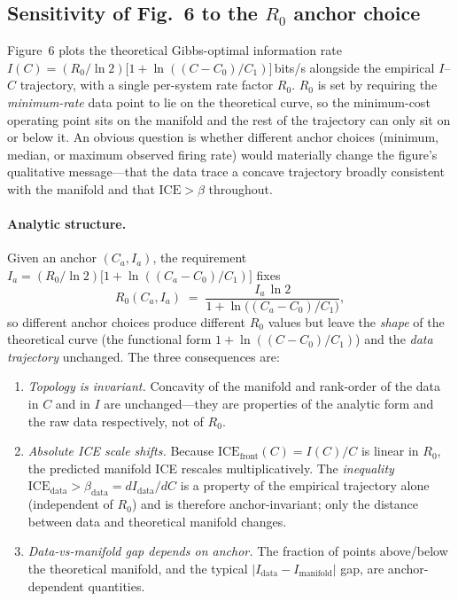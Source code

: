 \documentclass[11pt]{article}
\theoremstyle{remark}
\theoremstyle{definition}
\begin{document}
\subsection{Sensitivity of Fig.~6 to the $R_0$ anchor choice}
\label{sec:anchor-sensitivity}

Figure~6 plots the theoretical Gibbs-optimal information rate $I(C) = (R_0/\ln 2)\big[1+\ln((C-C_0)/C_1)\big]$\,bits/s alongside the empirical $I$--$C$ trajectory, with a single per-system rate factor $R_0$.  $R_0$ is set by requiring the \emph{minimum-rate} data point to lie on the theoretical curve, so the minimum-cost operating point sits on the manifold and the rest of the trajectory can only sit on or below it.  An obvious question is whether different anchor choices (minimum, median, or maximum observed firing rate) would materially change the figure's qualitative message---that the data trace a concave trajectory broadly consistent with the manifold and that $\mathrm{ICE}>\beta$ throughout.

\paragraph{Analytic structure.}
Given an anchor $(C_a, I_a)$, the requirement $I_a = (R_0/\ln 2)\big[1+\ln((C_a-C_0)/C_1)\big]$ fixes
\begin{equation}
  R_0(C_a, I_a) \;=\; \frac{I_a\,\ln 2}{1+\ln\!\big((C_a-C_0)/C_1\big)},
  \label{eq:R0-anchor}
\end{equation}
so different anchor choices produce different $R_0$ values but leave the \emph{shape} of the theoretical curve (the functional form $1+\ln((C-C_0)/C_1)$) and the \emph{data trajectory} unchanged.  The three consequences are:
\begin{enumerate}
\item \emph{Topology is invariant.}  Concavity of the manifold and rank-order of the data in $C$ and in $I$ are unchanged---they are properties of the analytic form and the raw data respectively, not of $R_0$.
\item \emph{Absolute ICE scale shifts.}  Because $\mathrm{ICE}_{\mathrm{front}}(C)=I(C)/C$ is linear in $R_0$, the predicted manifold ICE rescales multiplicatively.  The \emph{inequality} $\mathrm{ICE}_{\mathrm{data}}>\beta_{\mathrm{data}} = dI_{\mathrm{data}}/dC$ is a property of the empirical trajectory alone (independent of $R_0$) and is therefore anchor-invariant; only the distance between data and theoretical manifold changes.
\item \emph{Data-vs-manifold gap depends on anchor.}  The fraction of points above/below the theoretical manifold, and the typical $|I_{\mathrm{data}}-I_{\mathrm{manifold}}|$ gap, are anchor-dependent quantities.
\end{enumerate}
\end{document}
